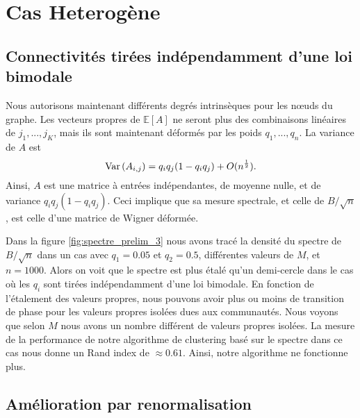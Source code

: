 \documentclass[../../main.tex]{subfiles} %
\begin{document}
\section{Cas Heterogène}

\subsection{Connectivités tirées indépendamment d'une loi bimodale}

Nous autorisons maintenant différents degrés intrinsèques pour les nœuds du 
graphe. Les vecteurs propres de $\mathbb{E}[A]$ ne seront plus des combinaisons 
linéaires de $j_1,...,j_K$, mais ils sont maintenant déformés par les poids 
$q_1,...,q_n$. La variance de $A$ est
\begin{equation*}
	\operatorname{Var} \left( A_{i,j} \right) = q_i q_j (1- q_i q_j) + O(n^\frac{1}{2}).
\end{equation*}
Ainsi, $A$ est une matrice à entrées indépendantes, de moyenne nulle, et de 
variance $q_i q_j (1-q_i q_j).$ Ceci implique que sa mesure spectrale, et celle
de $B/\sqrt{n}$, est celle d'une matrice de Wigner déformée. 

Dans la figure \ref{fig:spectre_prelim_3} nous avons tracé la densité du spectre
de $B/\sqrt{n}$ dans un cas avec $q_1 = 0.05$ et $q_2 = 0.5$, différentes valeurs
de $M$, et $n = 1000$. Alors on voit que le spectre est plus étalé qu'un
demi-cercle dans le cas où les $q_i$ sont tirées indépendamment d'une loi
bimodale. En fonction de l'étalement des valeurs propres, nous pouvons avoir
plus ou moins de transition de phase pour les valeurs propres isolées dues aux 
communautés. Nous voyons que selon $M$ nous avons un nombre différent de valeurs
propres isolées. La mesure de la performance de notre algorithme de clustering
basé sur le spectre dans ce cas nous donne un Rand index de $\approx 0.61$.
Ainsi, notre algorithme ne fonctionne plus.

\subsection{Amélioration par renormalisation}
\end{document}
